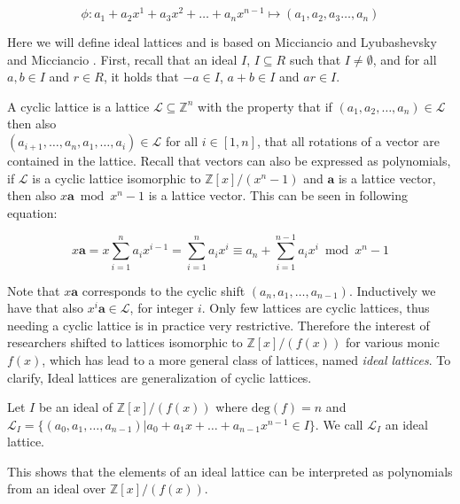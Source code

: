 \begin{equation}
    \phi: a_1 + a_2x^1 + a_3x^2 + \dots + a_nx^{n-1} \mapsto (a_1, a_2, a_3 \dots , a_n)
\end{equation}



Here we will define ideal lattices and is based on Micciancio \cite{Mic07cyclic} and Lyubashevsky and Micciancio \cite{LyuMic06icalp}. First, recall that an ideal $I$, $I \subseteq R$ such that $I \neq \emptyset$, and for all $a, b \in I$ and $r \in R$, it holds that $-a \in I$, $a + b \in I$ and $ar \in I$.



A cyclic lattice is a lattice $\mathcal{L} \subseteq \mathbb{Z}^n$ with the property that if $(a_1, a_2, \dots , a_n) \in \mathcal{L}$ then also \\$(a_{i+1}, \dots , a_n, a_1, \dots , a_i) \in \mathcal{L}$ for all $i \in [1, n]$, \meaning that all rotations of a vector are contained in the lattice. Recall that vectors can also be expressed as polynomials, if $\mathcal{L}$ is a cyclic lattice isomorphic to $\mathbb{Z}[x] / ( x^n - 1 )$ and $\textbf{a}$ is a lattice vector, then also $x \textbf{a} \bmod x^n - 1$ is a lattice vector. This can be seen in following equation:

\begin{equation}
    x\textbf{a} = x \sum_{i=1}^n a_ix^{i-1} = \sum_{i=1}^n a_ix^i \equiv a_n + \sum_{i=1}^{n-1} a_ix^i \bmod x^n - 1
\end{equation}

Note that $x\textbf{a}$ corresponds to the cyclic shift $(a_n, a_1, \dots , a_{n-1})$. Inductively we have that also $x^i\textbf{a} \in \mathcal{L}$, for integer $i$. Only few lattices are cyclic lattices, thus needing a cyclic lattice is in practice very restrictive. Therefore the interest of researchers shifted to lattices isomorphic to $\mathbb{Z}[x]/( f(x) )$ for various monic $f(x)$, which has lead to a more general class of lattices, named \textit{ideal lattices}. To clarify, Ideal lattices are generalization of cyclic lattices.

\begin{definition}
\normalfont
Let $I$ be an ideal of $\mathbb{Z}[x]/(f(x))$ where $\text{deg}(f) = n$ and $\mathcal{L}_I = \{ (a_0, a_1, \dots, a_{n-1}) | a_0 + a_1x + \dots + a_{n-1}x^{n-1} \in I\}$. We call $\mathcal{L}_I$ an ideal lattice.
\end{definition}

This shows that the elements of an ideal lattice can be interpreted as polynomials from an ideal over $\mathbb{Z}[x]/( f(x) )$.


